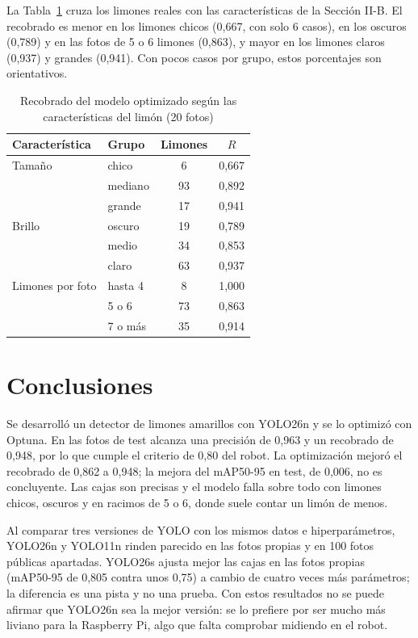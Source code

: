 \documentclass[conference]{IEEEtran}
\begin{document}
La Tabla~\ref{tab:feature} cruza los limones reales con las características de la Sección II-B. El recobrado es menor en los limones chicos (0,667, con solo 6 casos), en los oscuros (0,789) y en las fotos de 5 o 6 limones (0,863), y mayor en los limones claros (0,937) y grandes (0,941). Con pocos casos por grupo, estos porcentajes son orientativos.

\begin{table}[t]
\caption{Recobrado del modelo optimizado según las características del limón (20 fotos)}
\label{tab:feature}
\centering
\small
\begin{tabular}{llcc}
\toprule
\textbf{Característica} & \textbf{Grupo} & \textbf{Limones} & $R$ \\
\midrule
Tamaño & chico & 6 & 0,667 \\
 & mediano & 93 & 0,892 \\
 & grande & 17 & 0,941 \\
Brillo & oscuro & 19 & 0,789 \\
 & medio & 34 & 0,853 \\
 & claro & 63 & 0,937 \\
Limones por foto & hasta 4 & 8 & 1,000 \\
 & 5 o 6 & 73 & 0,863 \\
 & 7 o más & 35 & 0,914 \\
\bottomrule
\end{tabular}
\end{table}

\section{Conclusiones}
Se desarrolló un detector de limones amarillos con YOLO26n y se lo optimizó con Optuna. En las fotos de test alcanza una precisión de 0,963 y un recobrado de 0,948, por lo que cumple el criterio de 0,80 del robot. La optimización mejoró el recobrado de 0,862 a 0,948; la mejora del mAP50-95 en test, de 0,006, no es concluyente. Las cajas son precisas y el modelo falla sobre todo con limones chicos, oscuros y en racimos de 5 o 6, donde suele contar un limón de menos.

Al comparar tres versiones de YOLO con los mismos datos e hiperparámetros, YOLO26n y YOLO11n rinden parecido en las fotos propias y en 100 fotos públicas apartadas. YOLO26s ajusta mejor las cajas en las fotos propias (mAP50-95 de 0,805 contra unos 0,75) a cambio de cuatro veces más parámetros; la diferencia es una pista y no una prueba. Con estos resultados no se puede afirmar que YOLO26n sea la mejor versión: se lo prefiere por ser mucho más liviano para la Raspberry Pi, algo que falta comprobar midiendo en el robot.
\end{document}
